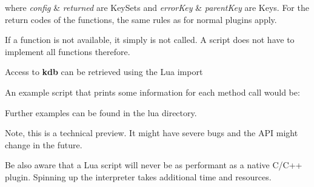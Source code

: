 where {\itshape config} \& {\itshape returned} are Key\+Sets and {\itshape error\+Key} \& {\itshape parent\+Key} are Keys. For the return codes of the functions, the same rules as for normal plugins apply.

If a function is not available, it simply is not called. A script does not have to implement all functions therefore.

Access to {\bfseries{kdb}} can be retrieved using the Lua import


\begin{DoxyCode}{0}
\end{DoxyCode}


An example script that prints some information for each method call would be\+:


\begin{DoxyCode}{0}
\DoxyCodeLine{}
\DoxyCodeLine{}
\DoxyCodeLine{}
\DoxyCodeLine{}
\end{DoxyCode}


Further examples can be found in the lua directory.

Note, this is a technical preview. It might have severe bugs and the A\+PI might change in the future.

Be also aware that a Lua script will never be as performant as a native C/\+C++ plugin. Spinning up the interpreter takes additional time and resources. 
